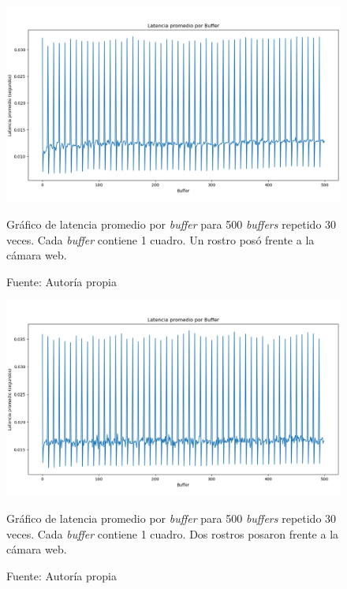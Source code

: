 \documentclass[a4paper,openright,12pt]{report}
\begin{document}
  \begin{figure}[!h]
    \centering
      \includegraphics[width=1.0\textwidth]{../images/latency-cheesefacetrack-1-faces.png}\par
    \caption{Gráfico de latencia promedio por \textit{buffer} para 500
             \textit{buffers} repetido 30 veces. Cada \textit{buffer}
             contiene 1 cuadro. Un rostro posó frente a la cámara web.}
      \label{fig:latency-cheesefacetrack-1-faces}
    \caption*{Fuente: Autoría propia}
  \end{figure}

  \begin{figure}[!h]
    \centering
      \includegraphics[width=1.0\textwidth]{../images/latency-cheesefacetrack-2-faces.png}\par
    \caption{Gráfico de latencia promedio por \textit{buffer} para 500
             \textit{buffers} repetido 30 veces. Cada \textit{buffer} contiene
             1 cuadro. Dos rostros posaron frente a la cámara web.}
      \label{fig:latency-cheesefacetrack-2-faces}
    \caption*{Fuente: Autoría propia}
  \end{figure}
\end{document}

